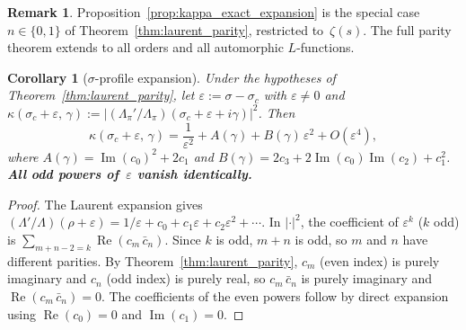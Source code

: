 \documentclass[11pt, a4paper]{article}
\theoremstyle{definition}
\newtheorem{remark}{Remark}[section]
\theoremstyle{plain}
\newtheorem{corollary}[theorem]{Corollary}
\begin{document}
\begin{remark}
Proposition~\ref{prop:kappa_exact_expansion} is the special case $n \in \{0,1\}$
of Theorem~\ref{thm:laurent_parity}, restricted to~$\zeta(s)$.
The full parity theorem extends to all orders and all automorphic $L$-functions.
\end{remark}

\begin{corollary}[$\sigma$-profile expansion]
\label{cor:sigma_profile}
Under the hypotheses of Theorem~\ref{thm:laurent_parity},
let $\varepsilon := \sigma - \sigma_c$ with $\varepsilon \neq 0$ and
$\kappa(\sigma_c{+}\varepsilon,\,\gamma) := |(\Lambda_\pi'/\Lambda_\pi)(\sigma_c{+}\varepsilon{+}i\gamma)|^2$.
Then
\begin{equation}\label{eq:sigma_profile}
  \kappa(\sigma_c + \varepsilon,\,\gamma)
  = \frac{1}{\varepsilon^2}
    + A(\gamma)
    + B(\gamma)\,\varepsilon^2
    + O(\varepsilon^4),
\end{equation}
where
$A(\gamma) = \operatorname{Im}(c_0)^2 + 2c_1$
and
$B(\gamma) = 2c_3 + 2\operatorname{Im}(c_0)\operatorname{Im}(c_2) + c_1^2$.
\textbf{All odd powers of~$\varepsilon$ vanish identically.}
\end{corollary}

\begin{proof}
The Laurent expansion gives
$(\Lambda'/\Lambda)(\rho+\varepsilon) = 1/\varepsilon + c_0 + c_1\varepsilon + c_2\varepsilon^2 + \cdots$.
In $|\cdot|^2$, the coefficient of $\varepsilon^k$ ($k$ odd) is
$\sum_{m+n-2=k} \operatorname{Re}(c_m\,\bar{c}_n)$.
Since $k$ is odd, $m+n$ is odd, so $m$ and $n$ have different parities.
By Theorem~\ref{thm:laurent_parity}, $c_m$ (even index) is purely imaginary and
$c_n$ (odd index) is purely real, so $c_m\,\bar{c}_n$ is purely imaginary
and $\operatorname{Re}(c_m\,\bar{c}_n) = 0$.
The coefficients of the even powers follow by direct expansion
using $\operatorname{Re}(c_0) = 0$ and $\operatorname{Im}(c_1) = 0$.
\end{proof}
\end{document}
